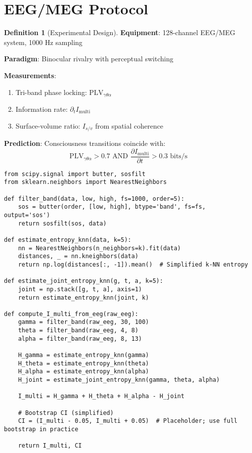 \documentclass[openany]{memoir}
\theoremstyle{definition}
\newtheorem{definition}{Definition}[chapter]
\theoremstyle{plain}
\theoremstyle{remark}
\newcommand{\Imulti}{I_{\text{multi}}}
\newcommand{\Isv}{I_{s/v}}
\begin{document}
\section{EEG/MEG Protocol}

\begin{definition}[Experimental Design]
\textbf{Equipment}: 128-channel EEG/MEG system, 1000 Hz sampling

\textbf{Paradigm}: Binocular rivalry with perceptual switching

\textbf{Measurements}:
\begin{enumerate}
\item Tri-band phase locking: $\text{PLV}_{\gamma\theta\alpha}$
\item Information rate: $\partial_t \Imulti$
\item Surface-volume ratio: $\Isv$ from spatial coherence
\end{enumerate}

\textbf{Prediction}: Consciousness transitions coincide with:
\begin{equation}
\text{PLV}_{\gamma\theta\alpha} > 0.7 \text{ AND } \frac{\partial \Imulti}{\partial t} > 0.3 \text{ bits/s}
\end{equation}
\end{definition}

\lstset{language=Python}
\begin{lstlisting}
from scipy.signal import butter, sosfilt
from sklearn.neighbors import NearestNeighbors

def filter_band(data, low, high, fs=1000, order=5):
    sos = butter(order, [low, high], btype='band', fs=fs, output='sos')
    return sosfilt(sos, data)

def estimate_entropy_knn(data, k=5):
    nn = NearestNeighbors(n_neighbors=k).fit(data)
    distances, _ = nn.kneighbors(data)
    return np.log(distances[:, -1]).mean()  # Simplified k-NN entropy

def estimate_joint_entropy_knn(g, t, a, k=5):
    joint = np.stack([g, t, a], axis=1)
    return estimate_entropy_knn(joint, k)

def compute_I_multi_from_eeg(raw_eeg):
    gamma = filter_band(raw_eeg, 30, 100)
    theta = filter_band(raw_eeg, 4, 8)
    alpha = filter_band(raw_eeg, 8, 13)
    
    H_gamma = estimate_entropy_knn(gamma)
    H_theta = estimate_entropy_knn(theta)
    H_alpha = estimate_entropy_knn(alpha)
    H_joint = estimate_joint_entropy_knn(gamma, theta, alpha)
    
    I_multi = H_gamma + H_theta + H_alpha - H_joint
    
    # Bootstrap CI (simplified)
    CI = (I_multi - 0.05, I_multi + 0.05)  # Placeholder; use full bootstrap in practice
    
    return I_multi, CI
\end{lstlisting}
\end{document}
